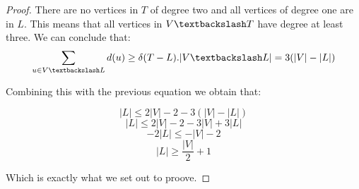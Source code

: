 \begin{appendices}
\begin{proof}
    There are no vertices in $T$ of degree two and all vertices of degree one are in $L$. This means that all vertices in $V \textbackslash T$ have degree at least three. We can conclude that:
    $$\sum_{u \in V\textbackslash L}{d(u)} \ge \delta(T - L).|V\textbackslash L| = 3(|V| - |L|) $$

    Combining this with the previous equation we obtain that:

    $$  |L| \le 2|V| - 2 - 3(|V| - |L|)$$
    $$  |L| \le 2|V| - 2 - 3|V| + 3|L|$$
    $$  -2|L| \le -|V| - 2$$
    $$  |L| \ge \frac{|V|}{2} + 1$$

    Which is exactly what we set out to proove.


\end{proof}
%
%
%
%
%
%
%
%
%
%
%
%
%

\end{appendices}
